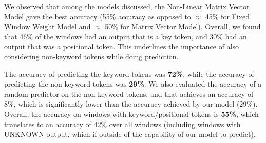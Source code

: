 We observed that among the models discussed, the Non-Linear Matrix Vector Model
gave the best accuracy (55\% accuracy as opposed to $\approx$ 45\% for Fixed
Window Weight Model and $\approx$ 50\% for Matrix Vector Model). Overall, we
found that 46\% of the windows had an output that is a key token, and 30\% had
an output that was a positional token. This underlines the importance of also
considering non-keyword tokens while doing prediction.

The accuracy of predicting the keyword tokens was {\bf 72\%}, while the accuracy
of predicting the non-keyword tokens was {\bf 29\%}. We also evaluated the
accuracy of a random predictor on the non-keyword tokens, and that achieves an
accuracy of 8\%, which is significantly lower than the accuracy achieved by our
model (29\%). Overall, the accuracy on windows with keyword/positional tokens is
{\bf 55\%}, which translates to an accuracy of 42\% over all windows (including
windows with UNKNOWN output, which if outside of the capability of our model to
predict).

